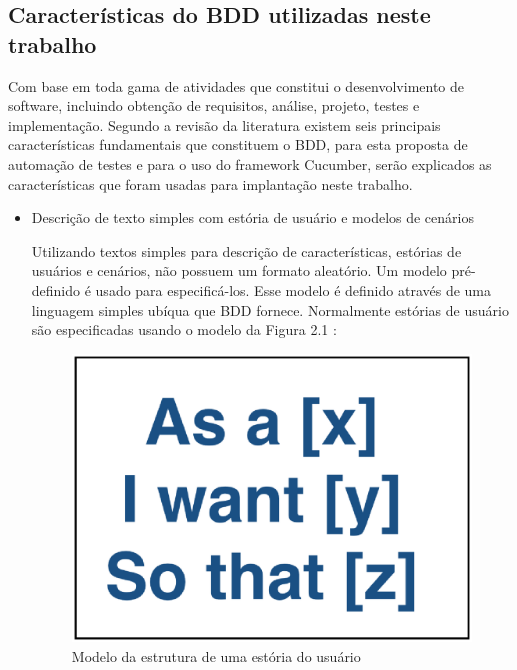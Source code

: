 \subsection{Características do BDD utilizadas neste trabalho}

Com base em toda gama de atividades que constitui o desenvolvimento de software, incluindo obtenção de requisitos, análise, projeto, testes e implementação. Segundo a revisão da literatura \cite{Solis2011} existem seis principais características fundamentais que constituem o BDD, para esta proposta de automação de testes e para o uso do framework Cucumber, serão explicados as características que foram usadas para implantação neste trabalho.

\begin{itemize}

	\item Descrição de texto simples com estória de usuário e modelos de cenários
	
Utilizando textos simples para descrição de características,  estórias de usuários e cenários, não possuem um formato aleatório. Um modelo pré-definido é usado para especificá-los. Esse modelo é definido através de uma linguagem simples ubíqua que BDD fornece. Normalmente estórias de usuário são especificadas usando o modelo da Figura 2.1 \cite{bddIntroducing}:

\begin{figure}[H]
	\centering
	\captionsetup{justification=centering,margin=2cm}
	\includegraphics[scale=0.35]{capitulos/literatura/userStory.eps}
	\caption{Modelo da estrutura de uma estória do usuário}
	\label{fig:iceCreamConAntiPattern}
\end{figure}


\end{itemize}
